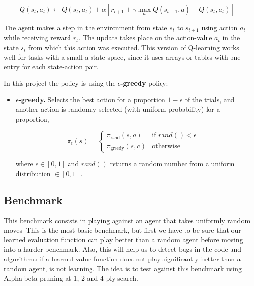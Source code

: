\documentclass[a4paper]{article}
\begin{document}
\begin{equation}
Q(s_t,a_t) \gets Q(s_t,a_t) + \alpha \left[r_{t+1} + \gamma \max_a Q(s_{t+1},a) - Q(s_t,a_t)\right]
\end{equation}

The agent makes a step in the environment from state $s_t$ to $s_{t+1}$ using action $a_t$ while receiving reward $r_t$. The update takes place on the action-value $a_t$ in the state $s_t$ from which this action was executed. This version of Q-learning works well for tasks with a small a state-space, since it uses arrays or tables with one entry for each state-action pair.

In this project the policy is using the \textbf{$\epsilon$-greedy} policy:

\begin{itemize}

    \item \textbf{$\epsilon$-greedy.} Selects the best action for a proportion
        $1 - \epsilon$ of the trials, and another action is randomly selected (with
        uniform probability) for a proportion,
        
        \begin{equation}
            \pi_{\epsilon}(s) = \left\{
             \begin{array}{lr}
                 \pi_{\textrm{rand}}(s,a) & \text{if } rand() < \epsilon\\
                 \pi_{\textrm{greedy}}(s,a) & \text{otherwise}
             \end{array}
           \right.
        \end{equation}

        where $\epsilon \in [0, 1]$ and $rand()$ returns a random number from a uniform distribution $\in [0, 1]$.

\end{itemize}

\subsection{Benchmark}

This benchmark consists in playing against an agent that takes uniformly random moves. This is the most basic benchmark, but first we have to be sure that our learned evaluation function can play better than a random agent before moving into a harder benchmark. Also, this will help us to detect bugs in the code and algorithms: if a learned value function does not play significantly better than a random agent, is not learning. The idea is to test against this benchmark using Alpha-beta pruning at 1, 2 and 4-ply search.
\end{document}
